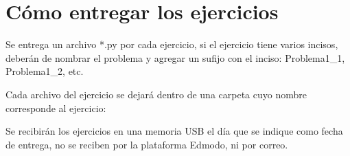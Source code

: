 \documentclass[12pt]{article}
\begin{document}
\section*{Cómo entregar los ejercicios}
Se entrega un archivo *.py por cada ejercicio, si el ejercicio tiene varios incisos, deberán de nombrar el problema y agregar un sufijo con el inciso: Problema1\_1, Problema1\_2, etc.
\par
Cada archivo del ejercicio se dejará dentro de una carpeta cuyo nombre corresponde al ejercicio:
\par
{}
Se recibirán los ejercicios en una memoria USB el día que se indique como fecha de entrega, no se reciben por la plataforma Edmodo, ni por correo.	
\end{document}
